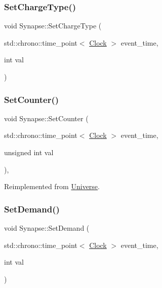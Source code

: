 \mbox{\label{classSynapse_a87fb31c2758d8fc26e8f2cf4fd7d1af5}} 
\subsubsection{\texorpdfstring{Set\+Charge\+Type()}{SetChargeType()}}
{\footnotesize\ttfamily void Synapse\+::\+Set\+Charge\+Type (\begin{DoxyParamCaption}\item[{std\+::chrono\+::time\+\_\+point$<$ \mbox{\hyperlink{universe_8h_a0ef8d951d1ca5ab3cfaf7ab4c7a6fd80}{Clock}} $>$}]{event\+\_\+time,  }\item[{int}]{val }\end{DoxyParamCaption})\hspace{0.3cm}{\ttfamily [inline]}}

\mbox{\label{classSynapse_aa1a990a7b89fbeaf1109a8b70d86111b}} 
\subsubsection{\texorpdfstring{Set\+Counter()}{SetCounter()}}
{\footnotesize\ttfamily void Synapse\+::\+Set\+Counter (\begin{DoxyParamCaption}\item[{std\+::chrono\+::time\+\_\+point$<$ \mbox{\hyperlink{universe_8h_a0ef8d951d1ca5ab3cfaf7ab4c7a6fd80}{Clock}} $>$}]{event\+\_\+time,  }\item[{unsigned int}]{val }\end{DoxyParamCaption})\hspace{0.3cm}{\ttfamily [inline]}, {\ttfamily [virtual]}}



Reimplemented from \mbox{\hyperlink{classUniverse_aa22202ae740eb1355529afcb13285e91}{Universe}}.

\mbox{\label{classSynapse_a1a6e54f679223615065572502df5e257}} 
\subsubsection{\texorpdfstring{Set\+Demand()}{SetDemand()}}
{\footnotesize\ttfamily void Synapse\+::\+Set\+Demand (\begin{DoxyParamCaption}\item[{std\+::chrono\+::time\+\_\+point$<$ \mbox{\hyperlink{universe_8h_a0ef8d951d1ca5ab3cfaf7ab4c7a6fd80}{Clock}} $>$}]{event\+\_\+time,  }\item[{int}]{val }\end{DoxyParamCaption})}

